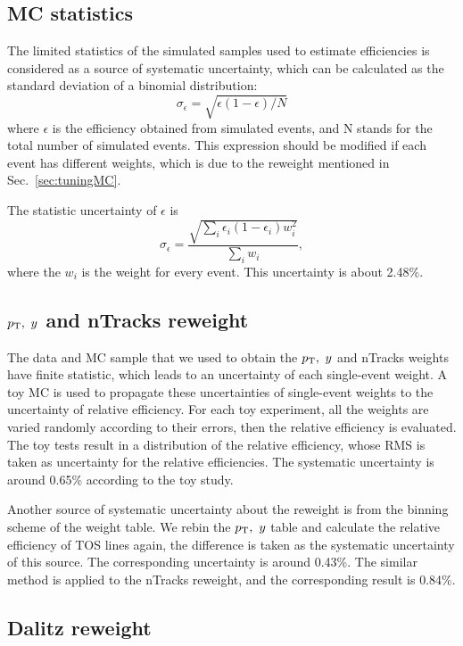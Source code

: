 \subsection{MC statistics}
\label{sec:mcstat}
The limited statistics of the simulated samples used to estimate efficiencies is considered as a source of systematic uncertainty, 
which can be calculated as the standard deviation of a binomial distribution:
\begin{equation}
\sigma_{\epsilon} = \sqrt{\epsilon(1-\epsilon)/N}
\end{equation}
where $\epsilon$ is the efficiency obtained from simulated events, 
and N stands for the total number of simulated events.
This expression should be modified if each event has different weights, 
which is due to the reweight mentioned in Sec.~\ref{sec:tuningMC}.

The statistic uncertainty of $\epsilon$ is
\begin{equation}
\sigma_{\epsilon} = \frac{\sqrt{\sum_i \epsilon_i(1-\epsilon_i) w_i^2}}{\sum_i  w_i },
 \end{equation}
where the $w_i$ is the weight for every event. This uncertainty is about 2.48\%.


\subsection{$p_{\mathrm{T}}, ~y$ and nTracks reweight}
\label{sec:ptyweight}
The data and MC sample that we used to obtain the $p_{\mathrm{T}}, ~y$ and nTracks weights have finite statistic, 
which leads to an uncertainty of each single-event weight.
A toy MC is used to propagate these uncertainties of single-event weights to the uncertainty of relative efficiency.
For each toy experiment, all the weights are varied randomly according to their errors, 
then the relative efficiency is evaluated.
The toy tests result in a distribution of the relative efficiency, 
whose RMS is taken as uncertainty for the relative efficiencies.
The systematic uncertainty is around 0.65\% according to the toy study.

Another source of systematic uncertainty about the reweight is from the binning scheme of the weight table. 
We rebin the $p_{\mathrm{T}}, ~y$ table and calculate the relative efficiency of TOS lines again, 
the difference is taken as the systematic uncertainty of this source.
The corresponding uncertainty is around 0.43\%.
The similar method is applied to the nTracks reweight, and the corresponding result is 0.84\%.


\subsection{Dalitz reweight}
\label{sec:dalitz}

